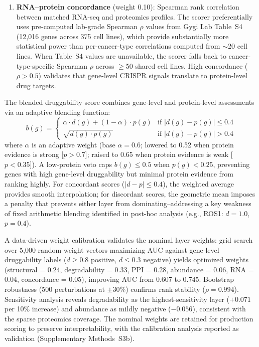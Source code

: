 \documentclass[times, twoside, watermark]{zHenriquesLab-StyleBioRxiv}
\begin{document}
\begin{enumerate}
\item \textbf{RNA--protein concordance} (weight 0.10): Spearman rank correlation between matched RNA-seq and proteomics profiles. The scorer preferentially uses pre-computed lab-grade Spearman $\rho$ values from Gygi Lab Table~S4~\cite{Nusinow2020} (12{,}016 genes across 375 cell lines), which provide substantially more statistical power than per-cancer-type correlations computed from $\sim$20 cell lines. When Table~S4 values are unavailable, the scorer falls back to cancer-type-specific Spearman $\rho$ across $\geq$50 shared cell lines. High concordance ($\rho > 0.5$) validates that gene-level CRISPR signals translate to protein-level drug targets.
\end{enumerate}
The blended druggability score combines gene-level and protein-level assessments via an adaptive blending function:
\begin{equation}
b(g) = \begin{cases}
\alpha \cdot d(g) + (1-\alpha) \cdot p(g) & \text{if } |d(g) - p(g)| \leq 0.4 \\
\sqrt{d(g) \cdot p(g)} & \text{if } |d(g) - p(g)| > 0.4
\end{cases}
\end{equation}
where $\alpha$ is an adaptive weight (base $\alpha = 0.6$; lowered to 0.52 when protein evidence is strong [$p > 0.7$]; raised to 0.65 when protein evidence is weak [$p < 0.35$]). A low-protein veto caps $b(g) \leq 0.5$ when $p(g) < 0.25$, preventing genes with high gene-level druggability but minimal protein evidence from ranking highly. For concordant scores ($|d - p| \leq 0.4$), the weighted average provides smooth interpolation; for discordant scores, the geometric mean imposes a penalty that prevents either layer from dominating--addressing a key weakness of fixed arithmetic blending identified in post-hoc analysis (e.g., ROS1: $d = 1.0$, $p = 0.4$).

A data-driven weight calibration validates the nominal layer weights: grid search over 5{,}000 random weight vectors maximizing AUC against gene-level druggability labels ($d \geq 0.8$ positive, $d \leq 0.3$ negative) yields optimized weights (structural = 0.24, degradability = 0.33, PPI = 0.28, abundance = 0.06, RNA = 0.04, concordance = 0.05), improving AUC from 0.607 to 0.745. Bootstrap robustness (500 perturbations at $\pm 30\%$) confirms rank stability ($\rho = 0.994$). Sensitivity analysis reveals degradability as the highest-sensitivity layer ($+0.071$ per 10\% increase) and abundance as mildly negative ($-0.056$), consistent with the sparse proteomics coverage. The nominal weights are retained for production scoring to preserve interpretability, with the calibration analysis reported as validation (Supplementary Methods~S3b).
\end{document}
